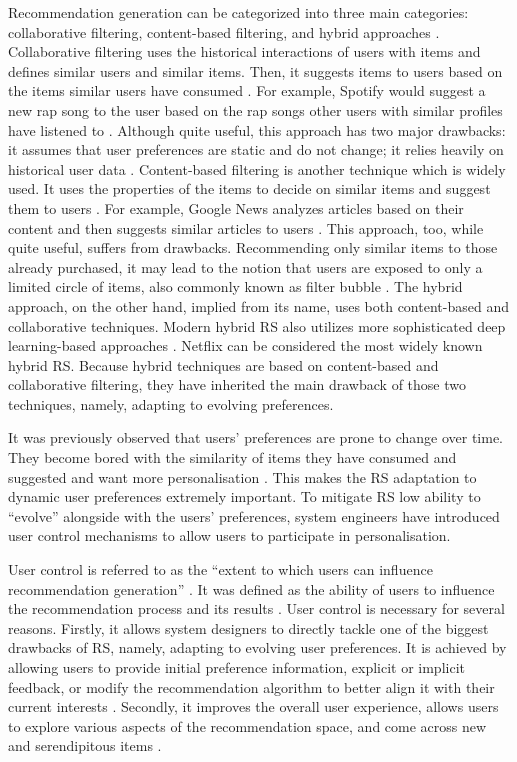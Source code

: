 \documentclass[a4paper,12pt]{article}
\begin{document}
Recommendation generation can be categorized into three main categories: collaborative filtering, content-based filtering, and hybrid approaches \citep{burke2002hybrid}. Collaborative filtering uses the historical interactions of users with items and defines similar users and similar items. Then, it suggests items to users based on the items similar users have consumed \citep{schafer1999recommender}. For example, Spotify would suggest a new rap song to the user based on the rap songs other users with similar profiles have listened to \citep{jacobson2016music}. Although quite useful, this approach has two major drawbacks: it assumes that user preferences are static and do not change; it relies heavily on historical user data \citep{wang2011collaborative}. Content-based filtering is another technique which is widely used. It uses the properties of the items to decide on similar items and suggest them to users \citep{pazzani2007content}. For example, Google News analyzes articles based on their content and then suggests similar articles to users \citep{das2007google}. This approach, too, while quite useful, suffers from drawbacks. Recommending only similar items to those already purchased, it may lead to the notion that users are exposed to only a limited circle of items, also commonly known as filter bubble \citep{tintarevKnowingUnknownVisualising2018}. The hybrid approach, on the other hand, implied from its name, uses both content-based and collaborative techniques. Modern hybrid RS also utilizes more sophisticated deep learning-based approaches \citep{bahrainian2020deep}. Netflix can be considered the most widely known hybrid RS. Because hybrid techniques are based on content-based and collaborative filtering, they have inherited the main drawback of those two techniques, namely, adapting to evolving preferences. 

It was previously observed that users' preferences are prone to change over time. They become bored with the similarity of items they have consumed and suggested and want more personalisation \citep{songWhenHowDiversify2019}. This makes the RS adaptation to dynamic user preferences extremely important. To mitigate RS low ability to ``evolve'' alongside with the users' preferences, system engineers have introduced user control mechanisms to allow users to participate in personalisation. 

User control is referred to as the ``extent to which users can influence recommendation generation'' \citep{jannach2019explanations}. It was defined as the ability of users to influence the recommendation process and its results \citep{knijnenburgExplainingUserExperience2012}. User control is necessary for several reasons. Firstly, it allows system designers to directly tackle one of the biggest drawbacks of RS, namely, adapting to evolving user preferences. It is achieved by allowing users to provide initial preference information, explicit or implicit feedback, or modify the recommendation algorithm to better align it with their current interests \citep{tintarev2015explaining}. Secondly, it improves the overall user experience, allows users to explore various aspects of the recommendation space, and come across new and serendipitous items \citep{tintarev2015explaining,kotkovSurveySerendipityRecommender2016}. 
\end{document}
